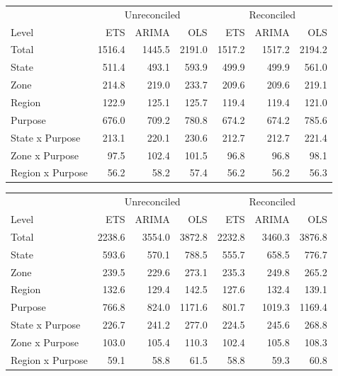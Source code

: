 \documentclass[11pt,a4paper,]{article}
\let\origtable\table
\let\endorigtable\endtable
\renewenvironment{table}[1][2] {
    \expandafter\origtable\expandafter[!htbp]
} {
    \endorigtable
}
\begin{document}
\begin{table}[!h]

\caption{\label{tab:Tourismdataresulrolling}Mean(RMSE) on 2 year test set for ETS, ARIMA and OLS with and without reconciliation - Rolling origin - Tourism dataset}
\centering
\begin{tabular}[t]{lrrrrrr}
\toprule
\multicolumn{1}{c}{} & \multicolumn{3}{c}{Unreconciled} & \multicolumn{3}{c}{Reconciled} \\
\cmidrule(l{3pt}r{3pt}){2-4} \cmidrule(l{3pt}r{3pt}){5-7}
Level & ETS & ARIMA & OLS & ETS & ARIMA & OLS\\
\midrule
Total & 1516.4 & 1445.5 & 2191.0 & 1517.2 & 1517.2 & 2194.2\\
State & 511.4 & 493.1 & 593.9 & 499.9 & 499.9 & 561.0\\
Zone & 214.8 & 219.0 & 233.7 & 209.6 & 209.6 & 219.1\\
Region & 122.9 & 125.1 & 125.7 & 119.4 & 119.4 & 121.0\\
Purpose & 676.0 & 709.2 & 780.8 & 674.2 & 674.2 & 785.6\\
State x Purpose & 213.1 & 220.1 & 230.6 & 212.7 & 212.7 & 221.4\\
Zone x Purpose & 97.5 & 102.4 & 101.5 & 96.8 & 96.8 & 98.1\\
Region x Purpose & 56.2 & 58.2 & 57.4 & 56.2 & 56.2 & 56.3\\
\bottomrule
\end{tabular}
\end{table}

\begin{table}

\caption{\label{tab:TourismdataresultRMSE}Mean(RMSE) on 2 year test set for ETS, ARIMA and OLS with and without reconciliation - Fixed origin - Tourism dataset}
\centering
\begin{tabular}[t]{lrrrrrr}
\toprule
\multicolumn{1}{c}{} & \multicolumn{3}{c}{Unreconciled} & \multicolumn{3}{c}{Reconciled} \\
\cmidrule(l{3pt}r{3pt}){2-4} \cmidrule(l{3pt}r{3pt}){5-7}
Level & ETS & ARIMA & OLS & ETS & ARIMA & OLS\\
\midrule
Total & 2238.6 & 3554.0 & 3872.8 & 2232.8 & 3460.3 & 3876.8\\
State & 593.6 & 570.1 & 788.5 & 555.7 & 658.5 & 776.7\\
Zone & 239.5 & 229.6 & 273.1 & 235.3 & 249.8 & 265.2\\
Region & 132.6 & 129.4 & 142.5 & 127.6 & 132.4 & 139.1\\
Purpose & 766.8 & 824.0 & 1171.6 & 801.7 & 1019.3 & 1169.4\\
State x Purpose & 226.7 & 241.2 & 277.0 & 224.5 & 245.6 & 268.8\\
Zone x Purpose & 103.0 & 105.4 & 110.3 & 102.4 & 105.8 & 108.3\\
Region x Purpose & 59.1 & 58.8 & 61.5 & 58.8 & 59.3 & 60.8\\
\bottomrule
\end{tabular}
\end{table}
\end{document}
